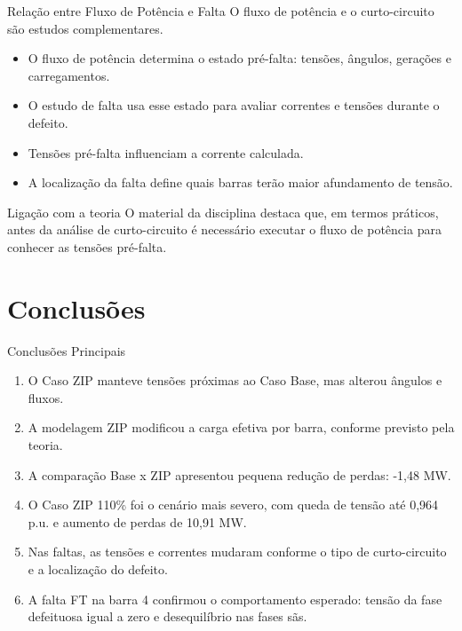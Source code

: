 \documentclass[aspectratio=169,11pt]{beamer}
\newcommand{\casobase}{Caso Base}
\newcommand{\casozip}{Caso ZIP}
\newcommand{\casozipcento}{Caso ZIP 110\%}
\newcommand{\pu}{p.u.}
\begin{document}
\begin{frame}{Relação entre Fluxo de Potência e Falta}
  O fluxo de potência e o curto-circuito são estudos complementares.

  \begin{itemize}
    \item O fluxo de potência determina o estado pré-falta: tensões, ângulos, gerações e carregamentos.
    \item O estudo de falta usa esse estado para avaliar correntes e tensões durante o defeito.
    \item Tensões pré-falta influenciam a corrente calculada.
    \item A localização da falta define quais barras terão maior afundamento de tensão.
  \end{itemize}

  \begin{block}{Ligação com a teoria}
    O material da disciplina destaca que, em termos práticos, antes da análise de curto-circuito é necessário executar o fluxo de potência para conhecer as tensões pré-falta.
  \end{block}
\end{frame}

\section{Conclusões}

\begin{frame}{Conclusões Principais}
  \begin{enumerate}
    \item O \casozip{} manteve tensões próximas ao \casobase, mas alterou ângulos e fluxos.
    \item A modelagem ZIP modificou a carga efetiva por barra, conforme previsto pela teoria.
    \item A comparação Base x ZIP apresentou pequena redução de perdas: -1,48 MW.
    \item O \casozipcento{} foi o cenário mais severo, com queda de tensão até 0,964 \pu{} e aumento de perdas de 10,91 MW.
    \item Nas faltas, as tensões e correntes mudaram conforme o tipo de curto-circuito e a localização do defeito.
    \item A falta FT na barra 4 confirmou o comportamento esperado: tensão da fase defeituosa igual a zero e desequilíbrio nas fases sãs.
  \end{enumerate}
\end{frame}
\end{document}

